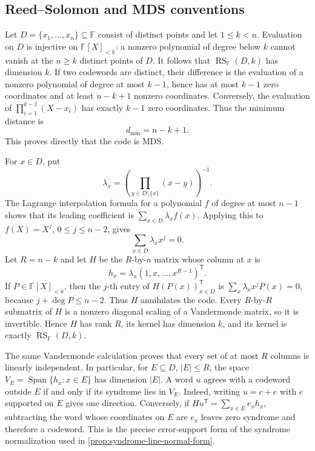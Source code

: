 \documentclass[11pt,a4paper]{amsart}
\numberwithin{equation}{section}
\theoremstyle{remark}
\DeclareMathOperator{\RS}{RS}
\DeclareMathOperator{\Span}{Span}
\newcommand{\F}{\mathbb F}
\begin{document}
\subsection{Reed--Solomon and MDS conventions}

Let \(D=\{x_1,\ldots,x_n\}\subseteq\F\) consist of distinct points and
let \(1\le k<n\).  Evaluation on \(D\) is injective on
\(\F[X]_{<k}\): a nonzero polynomial of degree below \(k\) cannot vanish
at the \(n\ge k\) distinct points of \(D\).  It follows that
\(\RS_\F(D,k)\) has dimension \(k\).  If two codewords are distinct,
their difference is the evaluation of a nonzero polynomial of degree at
most \(k-1\), hence has at most \(k-1\) zero coordinates and at least
\(n-k+1\) nonzero coordinates.  Conversely, the evaluation of
\(\prod_{i=1}^{k-1}(X-x_i)\) has exactly \(k-1\) zero coordinates.
Thus the minimum distance is
\[
                         d_{\min}=n-k+1.
\]
This proves directly that the code is MDS.

For \(x\in D\), put
\[
 \lambda_x=\left(\prod_{y\in D\setminus\{x\}}(x-y)\right)^{-1}.
\]
The Lagrange interpolation formula for a polynomial \(f\) of degree at
most \(n-1\) shows that its leading coefficient is
\(\sum_{x\in D}\lambda_x f(x)\).  Applying this to
\(f(X)=X^j\), \(0\le j\le n-2\), gives
\[
                         \sum_{x\in D}\lambda_xx^j=0.
\]
Let \(R=n-k\) and let \(H\) be the \(R\)-by-\(n\) matrix whose column at
\(x\) is
\[
                    h_x=\lambda_x(1,x,\ldots,x^{R-1})^{\mathsf T}.
\]
If \(P\in\F[X]_{<k}\), then the \(j\)-th entry of
\(H(P(x))_{x\in D}^{\mathsf T}\) is
\(\sum_x\lambda_xx^jP(x)=0\), because \(j+\deg P\le n-2\).
Thus \(H\) annihilates the code.  Every \(R\)-by-\(R\) submatrix of
\(H\) is a nonzero diagonal scaling of a Vandermonde matrix, so it is
invertible.  Hence \(H\) has rank \(R\), its kernel has dimension \(k\),
and its kernel is exactly \(\RS_\F(D,k)\).

The same Vandermonde calculation proves that every set of at most \(R\)
columns is linearly independent.  In particular, for
\(E\subseteq D\), \(|E|\le R\), the space
\(V_E=\Span\{h_x:x\in E\}\) has dimension \(|E|\).  A word \(u\) agrees
with a codeword outside \(E\) if and only if its syndrome lies in \(V_E\).
Indeed, writing \(u=c+e\) with \(e\) supported on \(E\) gives one
direction.  Conversely, if
\(Hu^{\mathsf T}=\sum_{x\in E}e_xh_x\), subtracting the word whose
coordinates on \(E\) are \(e_x\) leaves zero syndrome and therefore a
codeword.  This is the precise error-support form of the syndrome
normalization used in \cref{prop:syndrome-line-normal-form}.
\end{document}

